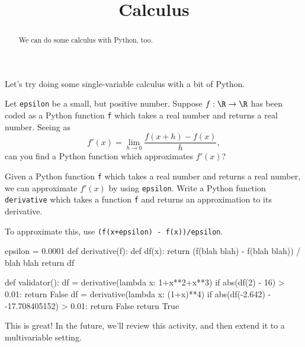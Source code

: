 \documentclass{ximera}
\title{Calculus}
\begin{document}
\begin{abstract}
  We can do some calculus with Python, too.
\end{abstract}
\maketitle

Let's try doing some single-variable calculus with a bit of Python.

Let \texttt{epsilon} be a small, but positive number.  Suppose $f:\R
\to \R$ has been coded as a Python function \texttt{f} which takes a
real number and returns a real number.  Seeing as
$$
f'(x) = \lim_{h \to 0} \frac{f(x+h) - f(x)}{h},
$$
can you find a Python function which approximates $f'(x)$?

Given a Python function \texttt{f} which takes a real number and
returns a real number, we can approximate $f'(x)$ by using
\texttt{epsilon}.  Write a Python function \texttt{derivative} which
takes a function \texttt{f} and returns an approximation to its
derivative.

\begin{solution}
  \begin{hint}
    To approximate this, use \texttt{(f(x+epsilon) - f(x))/epsilon}.
  \end{hint}
\begin{python}
epsilon = 0.0001
def derivative(f):
  def df(x): return (f(blah blah) - f(blah blah)) / blah blah
  return df

def validator():
  df = derivative(lambda x: 1+x**2+x**3)
  if abs(df(2) - 16) > 0.01:
    return False
  df = derivative(lambda x: (1+x)**4)
  if abs(df(-2.642) - -17.708405152) > 0.01:
    return False
  return True
\end{python}
This is great!  In the future, we'll review this activity, and then extend it to a multivariable setting.
\end{solution}









\end{document}
